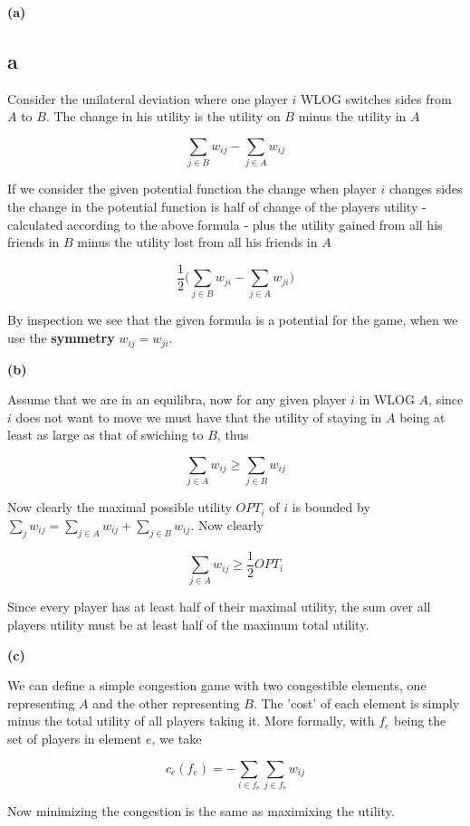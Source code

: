 
\textbf{(a)}

\subsection*{a}

Consider the unilateral deviation where one player $i$ WLOG switches sides from $A$ to $B$. The change in his utility is the utility on $B$ minus the utility in $A$

$$
\sum_{j \in B} w_{ij} - \sum_{j \in A} w_{ij}
$$

If we consider the given potential function the change when player $i$ changes sides the change in the potential function is half of change of the players utility - calculated according to the above formula - plus the utility gained from all his friends in $B$ minus the utility lost from all his friends in $A$

$$
\frac{1}{2} \bigg( \sum_{j \in B} w_{ji} - \sum_{j \in A} w_{ji} \bigg)
$$

By inspection we see that the given formula is a potential for the game, when we use the \textbf{symmetry} $w_{ij} = w_{ji}$. 


\textbf{(b)}

Assume that we are in an equilibra, now for any given player $i$ in WLOG $A$, since $i$ does not want to move we must have that the utility of staying in $A$ being at least as large as that of swiching to $B$, thus

$$
\sum_{j \in A} w_{ij} \ge \sum_{j \in B} w_{ij}
$$

Now clearly the maximal possible utility $OPT_i$ of $i$ is bounded by $\sum_j w_{ij} = \sum_{j \in A} w_{ij} + \sum_{j \in B} w_{ij}$. Now clearly 

$$
\sum_{j \in A} w_{ij} \ge \frac{1}{2} OPT_i
$$

Since every player has at least half of their maximal utility, the sum over all players utility must be at least half of the maximum total utility.


\textbf{(c)}

We can define a simple congestion game with two congestible elements, one representing $A$ and the other representing $B$. The 'cost' of each element is simply minus the total utility of all players taking it. More formally, with $f_e$ being the set of players in element $e$, we take

$$
c_e(f_e) = - \sum_{i \in f_e} \sum_{j \in f_e} w_{ij}
$$

Now minimizing the congestion is the same as maximixing the utility.

